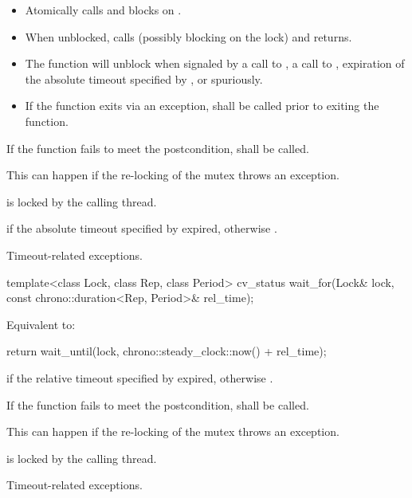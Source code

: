 \begin{itemdescr}
\pnum
\effects

\begin{itemize}
\item
Atomically calls  and blocks on .

\item
When unblocked, calls  (possibly blocking on the lock) and returns.

\item
The function will unblock when signaled by a call to , a call to ,
expiration of the absolute timeout specified by ,
or spuriously.

\item
If the function exits via an exception,  shall be called prior to exiting the function.
\end{itemize}

\pnum
\remarks
If the function fails to meet the postcondition, 
shall be called.
\begin{note}
This can happen if the re-locking of the mutex throws an exception.
\end{note}

\pnum
\ensures
{} is locked by the calling thread.

\pnum
\returns
{} if
the absolute timeout specified by  expired,
otherwise .

\pnum
\throws
Timeout-related
exceptions.

\end{itemdescr}

%
\begin{itemdecl}
template<class Lock, class Rep, class Period>
  cv_status wait_for(Lock& lock, const chrono::duration<Rep, Period>& rel_time);
\end{itemdecl}

\begin{itemdescr}
\pnum
\effects
Equivalent to:
\begin{codeblock}
return wait_until(lock, chrono::steady_clock::now() + rel_time);
\end{codeblock}

\pnum
\returns
{} if
the relative timeout specified by  expired,
otherwise .

\pnum
\remarks
If the function fails to meet the postcondition, 
shall be called.
\begin{note}
This can happen if the re-locking of the mutex throws an exception.
\end{note}

\pnum
\ensures
{} is locked by the calling thread.

\pnum
\throws
Timeout-related
exceptions.

\end{itemdescr}

